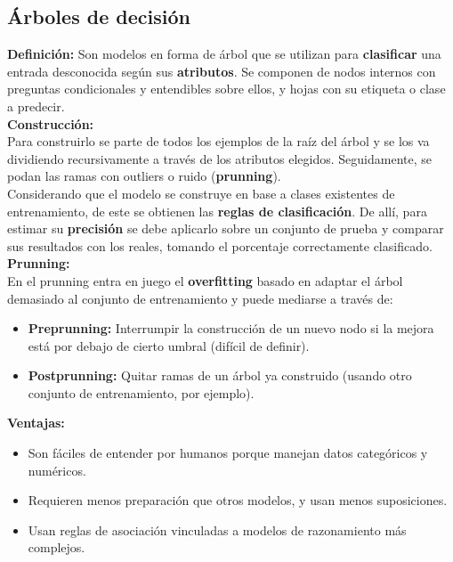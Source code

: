 \subsection*{Árboles de decisión}
\textbf{Definición:} Son modelos en forma de árbol que se utilizan para \textbf{clasificar} una entrada desconocida según sus \textbf{atributos}. Se componen de nodos internos con preguntas condicionales y entendibles sobre ellos, y hojas con su etiqueta o clase a predecir. \\
\textbf{Construcción:} \\
Para construirlo se parte de todos los ejemplos de la raíz del árbol y se los va dividiendo recursivamente a través de los atributos elegidos. Seguidamente, se podan las ramas con outliers o ruido (\textbf{prunning}). \\
Considerando que el modelo se construye en base a clases existentes de entrenamiento, de este se obtienen las \textbf{reglas de clasificación}. De allí, para estimar su \textbf{precisión} se debe aplicarlo sobre un conjunto de prueba y comparar sus resultados con los reales, tomando el porcentaje correctamente clasificado. \\
\textbf{Prunning:} \\
En el prunning entra en juego el \textbf{overfitting} basado en adaptar el árbol demasiado al conjunto de entrenamiento y puede mediarse a través de:
\begin{itemize}
    \item \textbf{Preprunning:} Interrumpir la construcción de un nuevo nodo si la mejora está por debajo de cierto umbral (difícil de definir).
    \item \textbf{Postprunning:} Quitar ramas de un árbol ya construido (usando otro conjunto de entrenamiento, por ejemplo).
\end{itemize}

\textbf{Ventajas:}

\begin{itemize}
    \item Son fáciles de entender por humanos porque manejan datos categóricos y numéricos.
    \item Requieren menos preparación que otros modelos, y usan menos suposiciones.
    \item Usan reglas de asociación vinculadas a modelos de razonamiento más complejos.
\end{itemize}

